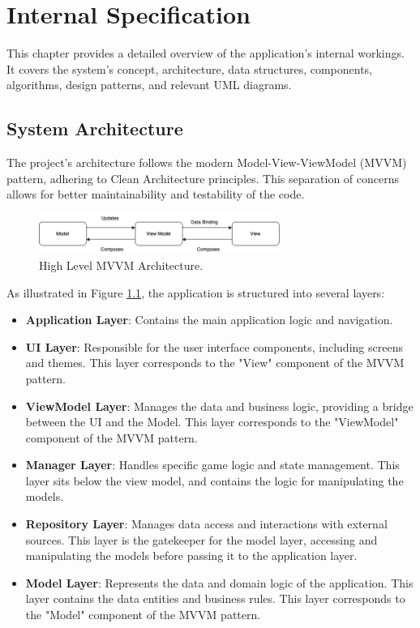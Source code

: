 \chapter{Internal Specification}
\label{chap:internal-specifications}

This chapter provides a detailed overview of the application's internal workings. It covers the system's concept, architecture, data structures, components, algorithms, design patterns, and relevant UML diagrams.

\section{System Architecture}

The project's architecture follows the modern Model-View-ViewModel (MVVM) pattern, adhering to Clean Architecture principles. This separation of concerns allows for better maintainability and testability of the code.

\begin{figure}[ht!]
    \centering
    \includegraphics[width=0.7\textwidth]{img/mvvm_explanation.png}
    \caption{High Level MVVM Architecture.}
    \label{fig:mvvm_explanation}
\end{figure}

As illustrated in Figure \ref{fig:mvvm_explanation}, the application is structured into several layers:

\begin{itemize}
    \item \textbf{Application Layer}: Contains the main application logic and navigation.
    \item \textbf{UI Layer}: Responsible for the user interface components, including screens and themes. This layer corresponds to the "View" component of the MVVM pattern.
    \item \textbf{ViewModel Layer}: Manages the data and business logic, providing a bridge between the UI and the Model. This layer corresponds to the "ViewModel" component of the MVVM pattern.
    \item \textbf{Manager Layer}: Handles specific game logic and state management. This layer sits below the view model, and contains the logic for manipulating the models.
    \item \textbf{Repository Layer}: Manages data access and interactions with external sources. This layer is the gatekeeper for the model layer, accessing and manipulating the models before passing it to the application layer.
    \item \textbf{Model Layer}: Represents the data and domain logic of the application. This layer contains the data entities and business rules. This layer corresponds to the "Model" component of the MVVM pattern.
\end{itemize}


